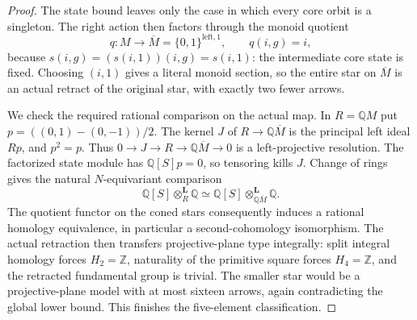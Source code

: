 \begin{proof}
The state bound leaves only the case in which every
core orbit is a singleton.  The right action then
factors through the monoid quotient
\[
 q:M\longrightarrow\overline M=\{0,1\}^{\mathrm{left},1},
 \qquad q(i,g)=i,
\]
because $s(i,g)=(s(i,1))(i,g)=s(i,1)$: the intermediate
core state is fixed.  Choosing $(i,1)$ gives a literal
monoid section, so the entire star on $\overline M$
is an actual retract of the original star, with exactly
two fewer arrows.

We check the required rational comparison on the actual
map.  In $R=\mathbb QM$ put
$p=((0,1)-(0,-1))/2$.  The kernel $J$ of
$R\to\mathbb Q\overline M$ is the principal left
ideal $Rp$, and $p^2=p$.  Thus
$0\to J\to R\to\mathbb Q\overline M\to0$ is a
left-projective resolution.  The factorized state module
has $\mathbb Q[S]p=0$, so tensoring kills $J$.
Change of rings gives the natural $N$-equivariant
comparison
\[
 \mathbb Q[S]\otimes_R^{\mathbf L}\mathbb Q
 \simeq
 \mathbb Q[S]\otimes_{\mathbb Q\overline M}^{\mathbf L}
 \mathbb Q.
\]
The quotient functor on the coned stars consequently
induces a rational homology equivalence, in particular
a second-cohomology isomorphism.  The actual retraction
then transfers projective-plane type integrally: split
integral homology forces $H_2=\mathbb Z$, naturality of
the primitive square forces $H_4=\mathbb Z$, and the
retracted fundamental group is trivial.  The smaller
star would be a projective-plane model with at most
sixteen arrows, again contradicting the global lower
bound.  This finishes the five-element classification.
\end{proof}
